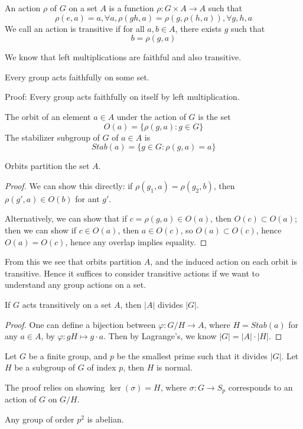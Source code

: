 \begin{defn}
    An action $\rho$ of $G$ on a set $A$ is a function $\rho: G\times A\to A$ such that 
    \begin{equation*}
        \rho(e,a)=a, \forall a, \rho(gh,a)=\rho(g, \rho(h,a)), \forall g,h, a
    \end{equation*}
    We call an action is transitive if for all $a,b\in A$, there exists $g$ such that
    \begin{equation*}
        b=\rho(g,a)
    \end{equation*}
\end{defn}
We know that left multiplications are faithful and also transitive.
\begin{thm}
    Every group acts faithfully on some set. 

    Proof: Every group acts faithfully on itself by left multiplication.
\end{thm}
\begin{defn}
    The orbit of an element $a\in A$ under the action of $G$ is the set
    \begin{equation*}
        O(a)=\{\rho(g,a): g\in G\}
    \end{equation*}
    The stabilizer subgroup of $G$ of $a\in A$ is
    \begin{equation*}
        Stab(a)=\{g\in G: \rho(g,a)=a\}
    \end{equation*}
\end{defn}
\begin{prop}
    Orbits partition the set $A$.
\end{prop}
\begin{proof}
    We can show this directly: if $\rho(g_1,a)=\rho(g_2, b)$, then $\rho(g',a)\in O(b)$ for ant $g'$.

    Alternatively, we can show that if $c=\rho(g,a)\in O(a)$, then $O(c)\subset O(a)$; then we can show if $c\in O(a)$, then $a\in O(c)$, so $O(a)\subset O(c)$, hence $O(a)=O(c)$, hence any overlap implies equality.
\end{proof}
From this we see that orbits partition $A$, and the induced action on each orbit is transitive. Hence it suffices to consider transitive actions if we want to understand any group actions on a set.

\begin{prop}
    If $G$ acts transitively on a set $A$, then $|A|$ divides $|G|$.
\end{prop}
\begin{proof}
    One can define a bijection between $\varphi: G/H\to A$, where $H=Stab(a)$ for any $a\in A$, by $\varphi: gH\mapsto g\cdot a$. Then by Lagrange's, we know $|G|=|A|\cdot|H|$.
\end{proof}
\begin{example}[9.11]
    Let $G$ be a finite group, and $p$ be the smallest prime such that it divides $|G|$. Let $H$ be a subgroup of $G$ of index $p$, then $H$ is normal.

    The proof relies on showing $\ker(\sigma)=H$, where $\sigma: G\to S_p$ corresponds to an action of $G$ on $G/H$. 
\end{example}


\begin{example}
    Any group of order $p^2$ is abelian.
\end{example}


